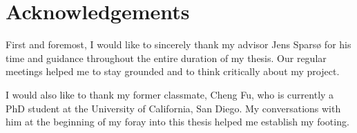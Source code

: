 \chapter{Acknowledgements}

First and foremost, I would like to sincerely thank my advisor Jens Sparsø for his time and guidance throughout the entire duration of my thesis. Our regular meetings helped me to stay grounded and to think critically about my project.

I would also like to thank my former classmate, Cheng Fu, who is currently a PhD student at the University of California, San Diego. My conversations with him at the beginning of my foray into this thesis helped me establish my footing.